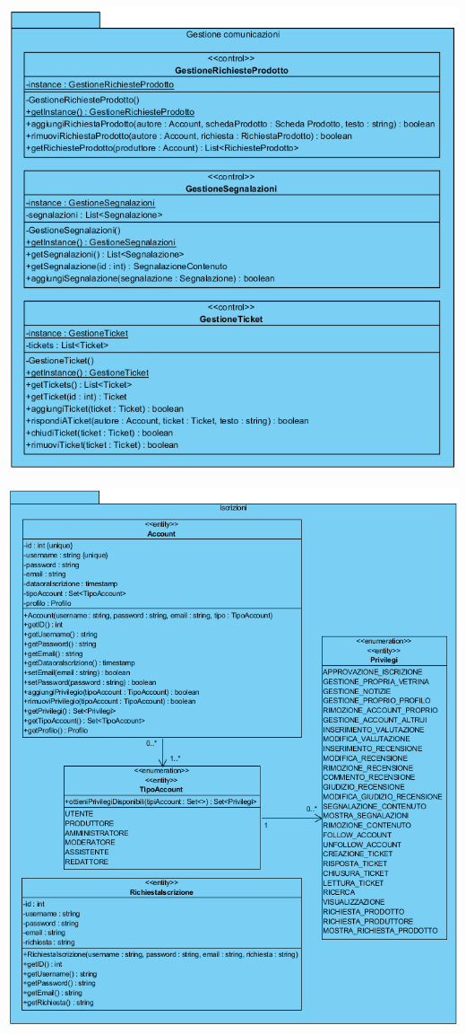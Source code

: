 \begin{center}
			\includegraphics[width=\textwidth]{assets/visualParadigm/classi/GestioniComunicazioni}
\end{center}

\begin{center}
			\includegraphics[width=\textwidth]{assets/visualParadigm/classi/Iscrizioni}
\end{center}

